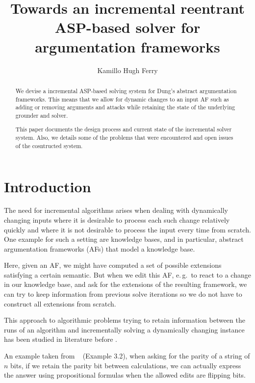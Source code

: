 \documentclass[oneside,12pt]{amsart}
\begin{document}
\title[Incremental AF solver]{Towards an incremental reentrant ASP-based solver for argumentation frameworks}
\author{Kamillo Hugh Ferry}
\address{}
\email{}

\begin{abstract}
    We devise a incremental ASP-based solving system for Dung's 
    abstract argumentation frameworks. This means 
    that we allow for dynamic changes to an input AF such as 
    adding or removing arguments and attacks while retaining
    the state of the underlying grounder and solver.
    
    This paper documents the design process and current state of 
    the incremental solver system. Also, we details some of
    the problems that were encountered and open issues of the 
    cosntructed system.
\end{abstract}

\maketitle

\section{Introduction}
The need for incremental algorithms arises when dealing with dynamically
changing inputs where it is desirable to process each such change relatively quickly
and where it is not desirable to process the input every time from scratch.
One example for such a setting are knowledge bases, and in particular,
abstract argumentation frameworks (AFs) that model a knowledge base.

Here, given an AF, we might have computed a set of possible extensions 
satisfying a certain semantic. But when we edit this AF, e.\,g.\ to react to 
a change in our knowledge base, and ask for the extensions of the resulting 
framework, we can try to keep information from previous solve iterations 
so we do not have to construct all extensions from scratch.

This approach to algorithmic problems trying to retain information between
the runs of an algorithm and incrementally solving a dynamically changing instance 
has been studied in literature before \cite{mans_incremental_2017,miltersen_complexity_1994,patnaik_dyn-fo_1997}.

An example taken from \citeauthor{patnaik_dyn-fo_1997}~\cite{patnaik_dyn-fo_1997} (Example 3.2), 
when asking for the parity of a string of $n$ bits, if we retain the
parity bit between calculations, we can actually express the answer using 
propositional formulas when the allowed edits are flipping bits. 
\end{document}
